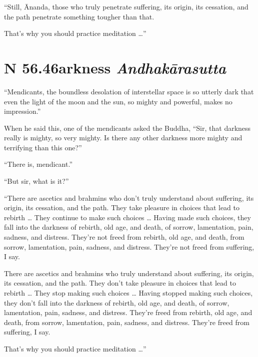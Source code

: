 \documentclass[12pt,openany]{book}%
\newcommand*{\suttatitleacronym}[1]{\smaller[2]{#1}\vspace*{.3em}}
\newcommand*{\suttatitletranslation}[1]{\linebreak{#1}}
\newcommand*{\suttatitleroot}[1]{\linebreak\smaller[2]\itshape{#1}}
\newcommand*{\tocacronym}[1]{\hspace*{-3.3em}{#1}\quad}
\newcommand*{\toctranslation}[1]{#1}
\newcommand*{\tocroot}[1]{(\textit{#1})}
\begin{document}
“Still, Ānanda, those who truly penetrate suffering, its origin, its cessation, and the path penetrate something tougher than that. 

That’s why you should practice meditation …” 

%
\section*{{\suttatitleacronym SN 56.46}{\suttatitletranslation Darkness }{\suttatitleroot Andhakārasutta}}
\addcontentsline{toc}{section}{\tocacronym{SN 56.46} \toctranslation{Darkness } \tocroot{Andhakārasutta}}

“Mendicants, the boundless desolation of interstellar space is so utterly dark that even the light of the moon and the sun, so mighty and powerful, makes no impression.” 

When he said this, one of the mendicants asked the Buddha, “Sir, that darkness really is mighty, so very mighty. Is there any other darkness more mighty and terrifying than this one?” 

“There is, mendicant.” 

“But sir, what is it?” 

“There are ascetics and brahmins who don’t truly understand about suffering, its origin, its cessation, and the path. They take pleasure in choices that lead to rebirth … They continue to make such choices … Having made such choices, they fall into the darkness of rebirth, old age, and death, of sorrow, lamentation, pain, sadness, and distress. They’re not freed from rebirth, old age, and death, from sorrow, lamentation, pain, sadness, and distress. They’re not freed from suffering, I say. 

There are ascetics and brahmins who truly understand about suffering, its origin, its cessation, and the path. They don’t take pleasure in choices that lead to rebirth … They stop making such choices … Having stopped making such choices, they don’t fall into the darkness of rebirth, old age, and death, of sorrow, lamentation, pain, sadness, and distress. They’re freed from rebirth, old age, and death, from sorrow, lamentation, pain, sadness, and distress. They’re freed from suffering, I say. 

That’s why you should practice meditation …” 
\end{document}
